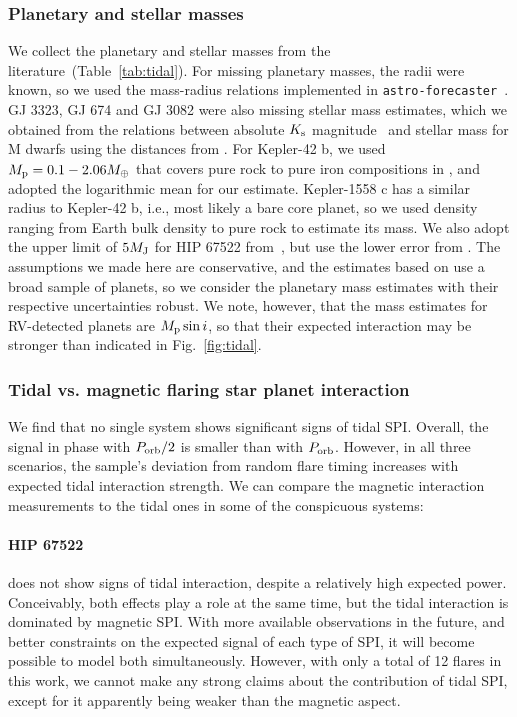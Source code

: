 \documentclass[twocolumn]{aastex631}
\begin{document}
\subsubsection{Planetary and stellar masses}
\label{sec:discussion:mpms}
We collect the planetary and stellar masses from the literature~(Table~\ref{tab:tidal}). For missing planetary masses, the radii were known, so we used the mass-radius relations implemented in \texttt{astro-forecaster}~\citep[Ben Cassesse's implementation of \texttt{forecaster},][]{chen2017probabilistic}. GJ 3323, GJ 674 and GJ 3082 were also missing stellar mass estimates, which we obtained from the \citep{mann2015how, mann2016erratum} relations between absolute $K_{\rm s}$ magnitude~\citep{skrutskie2006two} and stellar mass for M dwarfs using the distances from \citet{bailer-jones2021estimating}. For Kepler-42 b, we used  $M_{\rm p}=0.1-2.06M_\oplus$ that covers pure rock to pure iron compositions in \citet{muirhead2012characterizing}, and adopted the logarithmic mean for our estimate. Kepler-1558 c has a similar radius to Kepler-42 b, i.e., most likely a bare core planet, so we used density ranging from Earth bulk density to pure rock to estimate its mass. We also adopt the upper limit of $5M_{\rm J}$ for HIP 67522 from~\citet{rizzuto2020tess}, but use the lower error from \citet{chen2017probabilistic}. The assumptions we made here are conservative, and the estimates based on \citet{chen2017probabilistic} use a broad sample of planets, so we consider the planetary mass estimates with their respective uncertainties robust. We note, however, that the mass estimates for RV-detected planets are $M_{\rm p} \sin i$, so that their expected interaction may be stronger than indicated in Fig.~\ref{fig:tidal}. 

\subsubsection{Tidal vs. magnetic flaring star planet interaction}

We find that no single system shows significant signs of tidal SPI. Overall, the signal in phase with $P_{\rm orb}/2$ is smaller than with $P_{\rm orb}$. However, in all three scenarios, the sample's deviation from random flare timing increases with expected tidal interaction strength. We can compare the magnetic interaction measurements to the tidal ones in some of the conspicuous systems:

\paragraph{HIP 67522} does not show signs of tidal interaction, despite a relatively high expected power. Conceivably, both effects play a role at the same time, but the tidal interaction is dominated by magnetic SPI. With more available observations in the future, and better constraints on the expected signal of each type of SPI, it will become possible to model both simultaneously. However, with only a total of 12 flares in this work, we cannot make any strong claims about the contribution of tidal SPI, except for it apparently being weaker than the magnetic aspect.  
\end{document}
